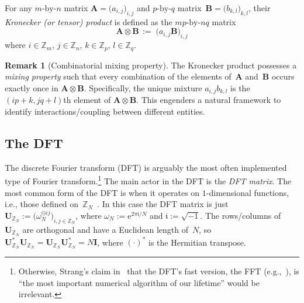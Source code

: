 \documentclass[letterpaper,11pt]{article}
\newcommand{\bs}[1]{{\boldsymbol{#1}}}
\newcommand{\gr}[1]{( #1 )}
\newcommand{\Gr}[1]{\big( #1 \big)}
\newcommand{\GR}[1]{\Big( #1 \Big)}
\newcommand{\Int}{\mathbb Z}
\newcommand{\e}{\mathrm{e}} %
\newcommand{\imag}{\mathfrak{i}}
\theoremstyle{definition} \newtheorem{remark}{Remark}
\begin{document}
For any $m\text{-by-}n$ matrix $\bs{A}=\Gr{a_{i,j}}_{i,j}$ and $p\text{-by-}q$ matrix~$\bs{B}=\Gr{b_{k,l}}_{k,l}$, their \emph{Kronecker (or tensor) product} is defined as the $mp\text{-by-}nq$ matrix
\begin{equation} \label{Def:KroneckerProduct}
\bs{A}\otimes\bs{B} \,:=\;
\GR{a_{i,j}\bs{B}}_{i,j}
\end{equation}
where $i\in\Int_m$, $j\in\Int_n$, $k\in\Int_p$, $l\in\Int_q$.

\begin{remark}[Combinatorial mixing property] \label{Rem:Mixing_property}
The Kronecker product possesses a \emph{mixing property} such that every combination of the elements of~$\bs{A}$ and~$\bs{B}$ occurs exactly once in $\bs{A}\otimes\bs{B}$. Specifically, the unique mixture $a_{i,j}b_{k,l}$ is the $\gr{ip+k,jq+l}$th element of $\bs{A}\otimes\bs{B}$. This engenders a natural framework to identify interactions/coupling between different entities.
\end{remark}


\subsection{The DFT}
The discrete Fourier transform (DFT) is arguably the most often implemented type of Fourier transform.\footnote{Otherwise, Strang's claim in~\cite{strang1994wavelets} that the DFT's fast version, the FFT (e.g.,~\cite{cooleytukey1965fft}), is ``the most important numerical algorithm of our lifetime'' would be irrelevant.} The main actor in the DFT is the \emph{DFT matrix}. The most common form of the DFT is when it operates on $1$-dimensional functions, i.e., those defined on~$\Int_N$~\cite[Ch.~2]{terras1999FourierAnalysisFiniteGroups}. In this case the DFT matrix is just $\bs{U}_{\Int_N} := \Gr{\omega_N^{\ominus ij}}_{i,j\in\Int_N}$,
where $\omega_N := \e^{2\pi\imag/N}$ and $\imag := \sqrt{-1}$. The rows/columns of~$\bs{U}_{\Int_N}$ are orthogonal and have a Euclidean length of~$N$, so $\bs{U}_{\Int_N}^*\bs{U}_{\Int_N} = \bs{U}_{\Int_N}\bs{U}_{\Int_N}^* = N\bs{I}$,
where $\gr{\cdot}^*$ is the Hermitian transpose.
\end{document}
